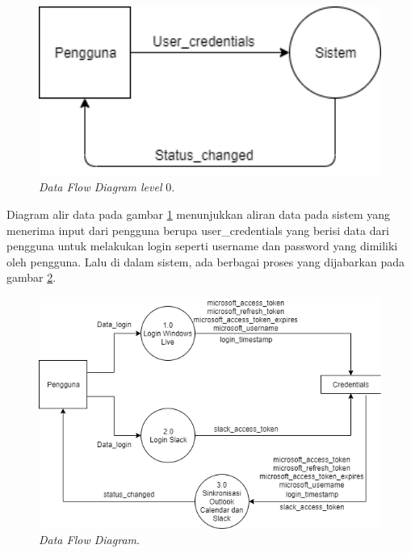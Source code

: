 \begin{figure}[h]
  \includegraphics[width=15cm]{./Gambar/DFDlvl0.png}
  \centering
  \caption{\textit{Data Flow Diagram level} 0.}
  \label{fig:dfdlvl0}
\end{figure}

Diagram alir data pada gambar \ref{fig:dfdlvl0} menunjukkan aliran data pada sistem yang menerima input dari pengguna berupa user\_credentials yang berisi data dari pengguna untuk melakukan login seperti username dan password yang dimiliki oleh pengguna. Lalu di dalam sistem, ada berbagai proses yang dijabarkan pada gambar \ref{fig:dfd}. 

\begin{figure}[h]
  \includegraphics[width=15cm]{./Gambar/DFDlvl1.png}
  \centering
  \caption{\textit{Data Flow Diagram}.}
  \label{fig:dfd}
\end{figure}

